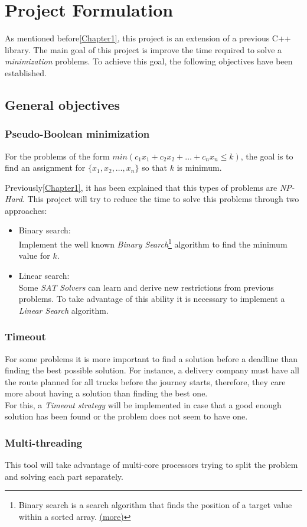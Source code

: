 \chapter{Project Formulation} %

\label{Chapter2} %

As mentioned before\ref{Chapter1}, this project is an extension of a previous C++ library. The main goal of this project is improve the time required to solve a \emph{minimization} problems. To achieve this goal, the following objectives have been established. 

\section{General objectives}

\subsection{Pseudo-Boolean minimization}
For the problems of the form $min(c_{1}x_{1}+c_{2}x_{2}+\ldots +c_{n}x_{n} \leq k)$, the goal is to find an assignment for $\{x_{1},x_{2},\ldots,x_{n}\}$ so that $k$ is minimum.

Previously\ref{Chapter1}, it has been explained that this types of problems are \emph{NP-Hard}. This project will try to reduce the time to solve this problems through two approaches:
\begin{itemize}
	\item Binary search:\\
		Implement the well known \emph{Binary Search}\footnote{Binary search is a search algorithm that finds the position of a target value within a sorted array. \href{https://en.wikipedia.org/wiki/Binary_search_algorithm}{(more)}} algorithm to find the minimum value for $k$.
	\item Linear search:\\
		Some \emph{SAT Solvers} can learn and derive new restrictions from previous problems. To take advantage of this ability it is necessary to implement a \emph{Linear Search} algorithm.
\end{itemize}

\subsection{Timeout}
For some problems it is more important to find a solution before a deadline than finding the best possible solution. For instance, a delivery company must have all the route planned for all trucks before the journey starts, therefore, they care more about having a solution than finding the best one.\\
For this, a \emph{Timeout strategy} will be implemented in case that a good enough solution has been found or the problem does not seem to have one. 
\subsection{Multi-threading}
This tool will take advantage of multi-core processors trying to split the problem and solving each part separately.
